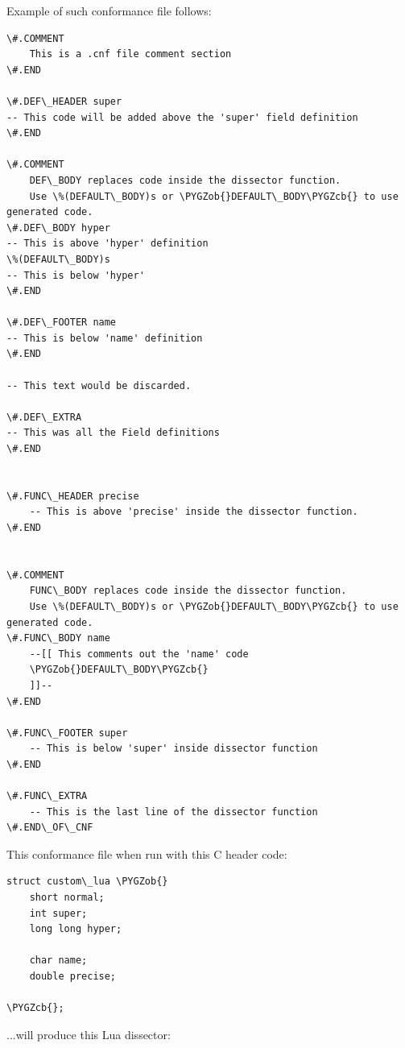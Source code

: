 \documentclass[A4paper,10pt,english]{sphinxmanual}
\def\PYGZob{\char`\{}
\def\PYGZcb{\char`\}}
\begin{document}
Example of such conformance file follows:

\begin{Verbatim}[commandchars=\\\{\}]
\#.COMMENT
    This is a .cnf file comment section
\#.END

\#.DEF\_HEADER super
-- This code will be added above the 'super' field definition
\#.END

\#.COMMENT
    DEF\_BODY replaces code inside the dissector function.
    Use \%(DEFAULT\_BODY)s or \PYGZob{}DEFAULT\_BODY\PYGZcb{} to use generated code.
\#.DEF\_BODY hyper
-- This is above 'hyper' definition
\%(DEFAULT\_BODY)s
-- This is below 'hyper'
\#.END

\#.DEF\_FOOTER name
-- This is below 'name' definition
\#.END

-- This text would be discarded.

\#.DEF\_EXTRA
-- This was all the Field definitions
\#.END


\#.FUNC\_HEADER precise
    -- This is above 'precise' inside the dissector function.
\#.END


\#.COMMENT
    FUNC\_BODY replaces code inside the dissector function.
    Use \%(DEFAULT\_BODY)s or \PYGZob{}DEFAULT\_BODY\PYGZcb{} to use generated code.
\#.FUNC\_BODY name
    --[[ This comments out the 'name' code
    \PYGZob{}DEFAULT\_BODY\PYGZcb{}
    ]]--
\#.END

\#.FUNC\_FOOTER super
    -- This is below 'super' inside dissector function
\#.END

\#.FUNC\_EXTRA
    -- This is the last line of the dissector function
\#.END\_OF\_CNF
\end{Verbatim}

This conformance file when run with this C header code:

\begin{Verbatim}[commandchars=\\\{\}]
struct custom\_lua \PYGZob{}
    short normal;
    int super;
    long long hyper;

    char name;
    double precise;

\PYGZcb{};
\end{Verbatim}

...will produce this Lua dissector:
\end{document}
